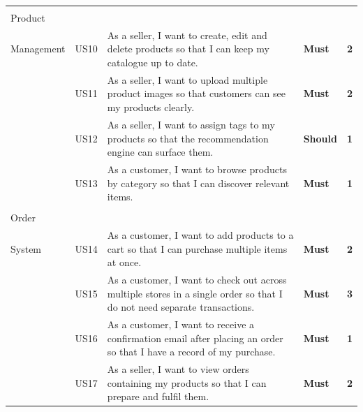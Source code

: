 \documentclass[12pt, a4paper, oneside]{report}
\begin{document}
\begin{longtable}{|>{\centering\arraybackslash\small}p{2.2cm}|>{\centering\arraybackslash\small}p{0.9cm}|>{\small}p{7.6cm}|>{\centering\arraybackslash\small}p{1.4cm}|>{\centering\arraybackslash\small}p{0.7cm}|}
  \cellcolor{featProduct}\makecell[c]{\textbf{F3}\\\small Product\\Management}
  & US10 & As a seller, I want to create, edit and delete products so that I can keep my catalogue up to date.
  & \cellcolor{moscowMust}\textbf{Must} & \cellcolor{complexMed}\textbf{2} \\\hline
  \cellcolor{featProduct}~
  & US11 & As a seller, I want to upload multiple product images so that customers can see my products clearly.
  & \cellcolor{moscowMust}\textbf{Must} & \cellcolor{complexMed}\textbf{2} \\\hline
  \cellcolor{featProduct}~
  & US12 & As a seller, I want to assign tags to my products so that the recommendation engine can surface them.
  & \cellcolor{moscowShould}\textbf{Should} & \cellcolor{complexLow}\textbf{1} \\\hline
  \cellcolor{featProduct}~
  & US13 & As a customer, I want to browse products by category so that I can discover relevant items.
  & \cellcolor{moscowMust}\textbf{Must} & \cellcolor{complexLow}\textbf{1} \\\hline

  \cellcolor{featOrder}\makecell[c]{\textbf{F4}\\\small Order\\System}
  & US14 & As a customer, I want to add products to a cart so that I can purchase multiple items at once.
  & \cellcolor{moscowMust}\textbf{Must} & \cellcolor{complexMed}\textbf{2} \\\hline
  \cellcolor{featOrder}~
  & US15 & As a customer, I want to check out across multiple stores in a single order so that I do not need separate transactions.
  & \cellcolor{moscowMust}\textbf{Must} & \cellcolor{complexHigh}\textbf{3} \\\hline
  \cellcolor{featOrder}~
  & US16 & As a customer, I want to receive a confirmation email after placing an order so that I have a record of my purchase.
  & \cellcolor{moscowMust}\textbf{Must} & \cellcolor{complexLow}\textbf{1} \\\hline
  \cellcolor{featOrder}~
  & US17 & As a seller, I want to view orders containing my products so that I can prepare and fulfil them.
  & \cellcolor{moscowMust}\textbf{Must} & \cellcolor{complexMed}\textbf{2} \\\hline


\end{longtable}
\end{document}
